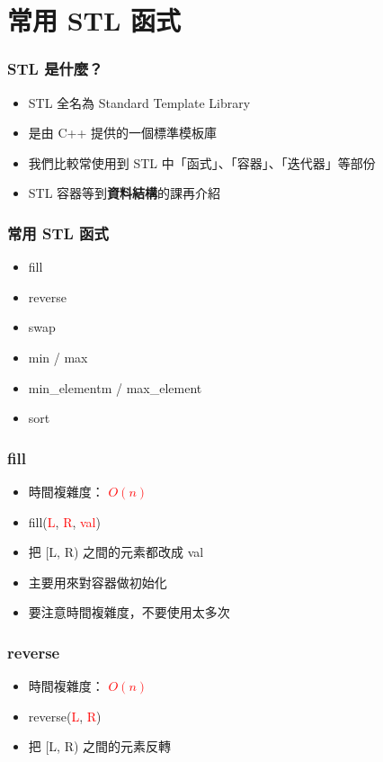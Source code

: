 \documentclass[mathserif]{beamer}
\begin{document}
\section{常用 STL 函式}
\begin{frame}
    \frametitle{STL 是什麼？}
    \begin{itemize}
        \item STL 全名為 Standard Template Library
        \item 是由 C++ 提供的一個標準模板庫
        \item 我們比較常使用到 STL 中「函式」、「容器」、「迭代器」等部份
        \vspace{0.5cm}
        \item STL 容器等到\textbf{資料結構}的課再介紹
    \end{itemize}
\end{frame}

\begin{frame}
    \frametitle{常用 STL 函式}
    \begin{itemize}
        \item fill
        \item reverse
        \item swap
        \item min / max
        \item min\_elementm / max\_element
        \item sort
    \end{itemize}
\end{frame}

\begin{frame}
    \frametitle{fill}
    \begin{itemize}
        \item 時間複雜度： \textcolor{red}{\textbf{$O(n)$}}
        \item fill(\textcolor{red}{L}, \textcolor{red}{R}, \textcolor{red}{val})
        \item 把 [L, R) 之間的元素都改成 val
        \vspace{0.5cm}
        \item 主要用來對容器做初始化
        \item 要注意時間複雜度，不要使用太多次
    \end{itemize}
\end{frame}

\begin{frame}
    \frametitle{reverse}
    \begin{itemize}
        \item 時間複雜度： \textcolor{red}{\textbf{$O(n)$}}
        \item reverse(\textcolor{red}{L}, \textcolor{red}{R})
        \item 把 [L, R) 之間的元素反轉
    \end{itemize}
\end{frame}
\end{document}
